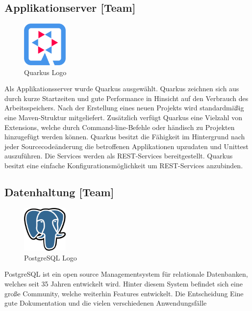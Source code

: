 \subsection{Applikationserver [Team]}
\begin{figure}
    \begin{center}
      \includegraphics[width=0.2\textwidth]{pics/quarkus_logo.png}
     \caption{Quarkus Logo}
    \end{center}
  \end{figure}
Als Applikationsserver wurde Quarkus ausgewählt. Quarkus zeichnen sich aus durch kurze Startzeiten und gute Performance in Hinsicht auf den Verbrauch des Arbeitsspeichers. Nach der Erstellung eines neuen Projekts wird standardmäßig eine Maven-Struktur mitgeliefert. Zusätzlich verfügt Quarkus eine Vielzahl von Extensions, welche durch Command-line-Befehle oder händisch zu Projekten hinzugefügt werden können. \cite{QuarkusAbout, QuarkusFirstApplication}
Quarkus besitzt die Fähigkeit im Hintergrund nach jeder Sourcecodeänderung die betroffenen Applikationen upzudaten und Unittest auszuführen.
Die Services werden als REST-Services bereitgestellt. Quarkus besitzt eine einfache Konfigurationsmöglichkeit um REST-Services anzubinden. 

\subsection{Datenhaltung [Team]}
\begin{figure}
    \begin{center}
      \includegraphics[width=0.2\textwidth]{pics/postgres_logo.png}
     \caption{PostgreSQL Logo}
    \end{center}
  \end{figure}
PostgreSQL ist ein open source Managementsystem für relationale Datenbanken, welches seit 35 Jahren entwickelt wird. Hinter diesem System befindet sich eine große Community, welche weiterhin Features entwickelt. Die Entscheidung Eine gute Dokumentation und die vielen verschiedenen Anwendungsfälle \cite{PostgreSQLAbout}






